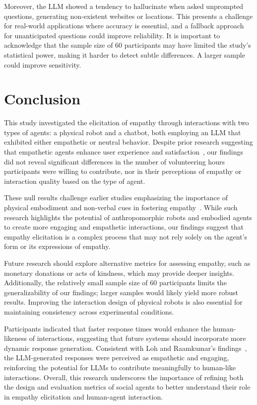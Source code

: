 \documentclass[runningheads]{llncs}
\begin{document}
Moreover, the LLM showed a tendency to hallucinate when asked unprompted questions, generating non-existent websites or locations. This presents a challenge for real-world applications where accuracy is essential, and a fallback approach for unanticipated questions could improve reliability. It is important to acknowledge that the sample size of 60 participants may have limited the study's statistical power, making it harder to detect subtle differences. A larger sample could improve sensitivity. 

\section{Conclusion}
\vspace{-0.5em}
This study investigated the elicitation of empathy through interactions with two types of agents: a physical robot and a chatbot, both employing an LLM that exhibited either empathetic or neutral behavior. Despite prior research suggesting that empathetic agents enhance user experience and satisfaction~\cite{bagheri2021,niculescu}, our findings did not reveal significant differences in the number of volunteering hours participants were willing to contribute, nor in their perceptions of empathy or interaction quality based on the type of agent.

These null results challenge earlier studies emphasizing the importance of physical embodiment and non-verbal cues in fostering empathy~\cite{lee,wainer,klein}. While such research highlights the potential of anthropomorphic robots and embodied agents to create more engaging and empathetic interactions, our findings suggest that empathy elicitation is a complex process that may not rely solely on the agent's form or its expressions of empathy.

Future research should explore alternative metrics for assessing empathy, such as monetary donations or acts of kindness, which may provide deeper insights. Additionally, the relatively small sample size of 60 participants limits the generalizability of our findings; larger samples would likely yield more robust results. Improving the interaction design of physical robots is also essential for maintaining consistency across experimental conditions.

Participants indicated that faster response times would enhance the human-likeness of interactions, suggesting that future systems should incorporate more dynamic response generation. Consistent with Loh and Raamkumar's findings~\cite{loh}, the LLM-generated responses were perceived as empathetic and engaging, reinforcing the potential for LLMs to contribute meaningfully to human-like interactions. Overall, this research underscores the importance of refining both the design and evaluation metrics of social agents to better understand their role in empathy elicitation and human-agent interaction.


\end{document}

